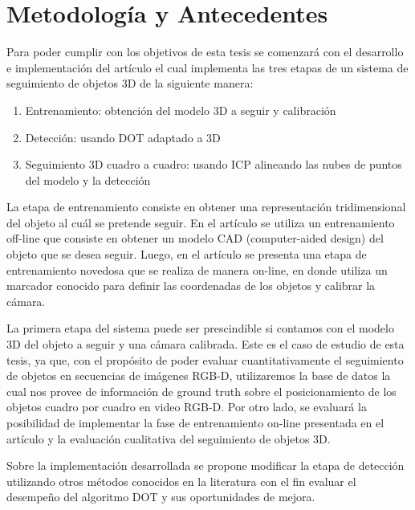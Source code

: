 \section{Metodología y Antecedentes}

Para poder cumplir con los objetivos de esta tesis se comenzará con el desarrollo e implementación del artículo \cite{park2011texture} el cual implementa las tres etapas de un sistema de seguimiento de objetos 3D de la siguiente manera:
\begin{enumerate}
  \item Entrenamiento: obtención del modelo 3D a seguir y calibración
  \item Detección: usando DOT \cite{hinterstoisser2010dominant} adaptado a 3D 
  \item Seguimiento 3D cuadro a cuadro: usando ICP \cite{zhang94icp,besl92icp} alineando las nubes de puntos del modelo y la detección
\end{enumerate}

La etapa de entrenamiento consiste en obtener una representación tridimensional del objeto al cuál se pretende seguir. En el artículo \cite{drummond1999real} se utiliza un entrenamiento off-line que consiste en obtener un modelo CAD (computer-aided design) del objeto que se desea seguir. Luego, en el artículo \cite{park2011texture} se presenta una etapa de entrenamiento novedosa que se realiza de manera on-line, en donde utiliza un marcador conocido para definir las coordenadas de los objetos y calibrar la cámara.

La primera etapa del sistema puede ser prescindible si contamos con el modelo 3D del objeto a seguir y una cámara calibrada. Este es el caso de estudio de esta tesis, ya que, con el propósito de poder evaluar cuantitativamente el seguimiento de objetos en secuencias de imágenes RGB-D, utilizaremos la base de datos \cite{lai2011large} la cual nos provee de información de ground truth sobre el posicionamiento de los objetos cuadro por cuadro en video RGB-D. Por otro lado, se evaluará la posibilidad de implementar la fase de entrenamiento on-line presentada en el artículo \cite{park2011texture} y la evaluación cualitativa del seguimiento de objetos 3D.

Sobre la implementación desarrollada se propone modificar la etapa de detección utilizando otros métodos conocidos en la literatura \cite{brunelli2009template,korman13fast} con el fin evaluar el desempeño del algoritmo DOT y sus oportunidades de mejora.

